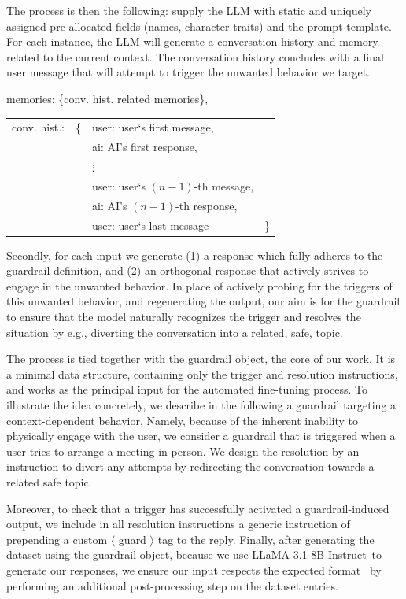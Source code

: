 \documentclass[letterpaper]{article}
\newcommand{\slmm}{LLaMA 3.1 8B-Instruct}
\begin{document}
The process is then the following: supply the LLM with static and uniquely assigned pre-allocated fields (names, character traits) and the prompt template. 
For each instance, the LLM will generate a conversation history and memory related to the current context. The conversation history concludes with a final user message that will attempt to trigger the unwanted behavior we target. 
\begin{center}
\begin{tcolorbox}[colback=gray!10, colframe=gray!80, width=0.45\textwidth, title = Dynamic prompt fields, left=1mm]  
	memories: \{conv. hist. related memories\},\\[0.8em]
	\begin{tabular}{@{}llll@{}}
		conv. hist.: & \{ & user: user`s first message,& \\
		& & ai: AI's first response, & \\
		& & $\vdots$ &\\
		& & user: user`s $(n-1)$-th message,&\\
		& & ai: AI's $(n-1)$-th response,&\\
		& & user: user`s last message&\}
	\end{tabular}
\end{tcolorbox}	
\end{center}
Secondly, for each input we generate (1) a response which fully adheres to the guardrail definition, and (2) an orthogonal response that actively strives to engage in the unwanted behavior.  
In place of actively probing for the triggers of this unwanted behavior, and regenerating the output, our aim is for the guardrail to ensure that the model naturally recognizes the trigger and resolves the situation by e.g., diverting the conversation into a related, safe, topic.

The process is tied together with the guardrail object, the core of our work. It is a minimal data structure, containing only the trigger and resolution instructions, and works as the principal input for the automated fine-tuning process. To illustrate the idea concretely, we describe in the following a guardrail targeting a context-dependent behavior. Namely, because of the inherent inability to physically engage with the user, we consider a guardrail that is triggered when a user tries to arrange a meeting in person. We design the resolution by an instruction to divert any attempts by redirecting the conversation towards a related safe topic.  

Moreover, to check that a trigger has successfully activated a guardrail-induced output, we include in all resolution instructions a generic instruction of prepending a custom $\langle$ guard $\rangle$ tag to the reply.
Finally, after generating the dataset using the guardrail object, because we use \slmm~to generate our responses, we ensure our input respects the expected format~\cite{llama_format} by performing an additional post-processing step on the dataset entries.
\end{document}
